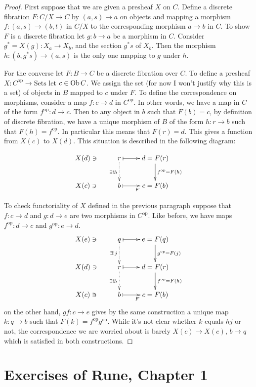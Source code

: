 \begin{proof}
First suppose that we are given a presheaf $X$ on $C$. Define a discrete
fibration $F:C/X \to C$ by $(a,s)\mapsto a$ on objects and
mapping a morphism $f:(a,s)\to (b,t)$ in $C/X$ to the
corresponding morphism $a \to b$ in $C$.
To show $F$ is a discrete fibration 
let $g:b\to a$ be a morphism in $C$. 
Consider $g^*=X(g):X_a\to X_b$,
and the section $g^*s$ of $X_b$.
Then the
morphism $h:(b,g^*s)\to (a,s)$ is the only one mapping to $g$ under $h$.

For the converse let $F:B \to C$ be a discrete fibration over $C$.
To define a presheaf $X:C^{\text{op}}\to \text{Sets}$ let $c \in \mathop{\mathrm{Ob}}\nolimits C$.
We assign the set (for now I won't justify why this is a set)
of objects in $B$ mapped to $c$ under $F$.
To define the correspondence on morphisms, 
consider a map $f:c \to d$ in $C^{\text{op}}$.
In other words, we have a map in  $C$ of the form $f^{\text{op}}:d \to c$.
Then to any object in $b$ such that $F(b)=c$,
by definition of discrete fibration,
we have a unique morphism of $B$ of the form
$h:r \to b$ such that $F(h)=f^{\text{op}}$.
In particular this means that $F(r)=d$.
This gives a function from $X(c)$ to $X(d)$.
This situation is described in the following diagram:

$$
\xymatrix{
X(d)\ni&r \ar@{.>}[d]_{\exists!h}\ar@{|->}[r]& d=F(r)
\ar[d]^{f^{\text{op}}=F(h)}\\
X(c)\ni& b\ar@{|->}[r]_F&c=F(b)
}
$$




To check functoriality of $X$ defined in the previous paragraph
suppose that $f:c\to d$ and $g:d\to e$ are two morphisms in $C^{\text{op}}$.
Like before, we have maps $f^{\text{op}}:d\to c$ and $g^{\text{op}}:e \to d$.
$$
\xymatrix{
X(e)\ni& q\ar@{.>}[d]_{\exists !j}\ar@{|->}[r]& e=F(q)
\ar[d]^{g^{\text{op}}=F(j)}\\
X(d)\ni&r \ar@{.>}[d]_{\exists!h}\ar@{|->}[r]& d=F(r)
\ar[d]^{f^{\text{op}}=F(h)}\\
X(c)\ni& b\ar@{|->}[r]_F&c=F(b)
}
$$
on the other hand, $gf:c \to e$ gives by the
same construction a unique map $k:q \to b$
such that $F(k)=f^{\text{op}}g^{\text{op}}$.
While it's not clear whether $k$ equals $hj$ or not,
the correspondence we are worried about is barely
$X(c) \to X(e)$, $b \mapsto q$ which is satisfied
in both constructions.

\end{proof}

\section{Exercises of Rune, Chapter 1}
\label{section-exercises-of-Rune-Chapter-1}


